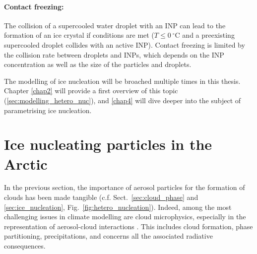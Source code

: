         \paragraph{Contact freezing:}
        The collision of a supercooled water droplet with an INP can lead to the formation of an ice crystal if  conditions are met ($T \leq 0~^{\circ}$C and a preexisting supercooled droplet collides with an active INP). Contact freezing is limited by the collision rate between droplets and INPs, which depends on the INP concentration as well as the size of the particles and droplets. %

    The modelling of ice nucleation will be broached multiple times in this thesis. Chapter \ref{chap2} will provide a first overview of this topic (\cref{sec:modelling_hetero_nuc}), and \cref{chap4} will dive deeper into the subject of parametrising ice nucleation. %
    \vspace{\baselineskip}


\section{Ice nucleating particles in the Arctic}
\label{sec:INP}
    
    In the previous section, the importance of aerosol particles for the formation of clouds has been made tangible (c.f. Sect.~\ref{sec:cloud_phase} and \ref{sec:ice_nucleation}, Fig.~\ref{fig:hetero_nucleation}).
    Indeed, among the most challenging issues in climate modelling are cloud microphysics, especially in the representation of aerosol-cloud interactions \citep{bony_clouds_2015}.
    This includes cloud formation, phase partitioning, precipitations, and concerns all the associated radiative consequences.


